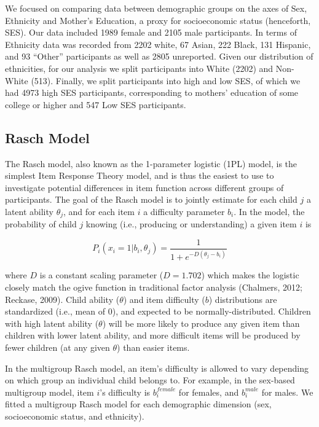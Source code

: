 \documentclass[10pt, letterpaper]{article}
\begin{document}
We focused on comparing data between demographic groups on the axes of
Sex, Ethnicity and Mother's Education, a proxy for socioeconomic status
(henceforth, SES). Our data included 1989 female and 2105 male
participants. In terms of Ethnicity data was recorded from 2202 white,
67 Asian, 222 Black, 131 Hispanic, and 93 ``Other'' participants as well
as 2805 unreported. Given our distribution of ethnicities, for our
analysis we split participants into White (2202) and Non-White (513).
Finally, we split participants into high and low SES, of which we had
4973 high SES participants, corresponding to mothers' education of some
college or higher and 547 Low SES participants.

\hypertarget{rasch-model}{%
\subsection{Rasch Model}\label{rasch-model}}

The Rasch model, also known as the 1-parameter logistic (1PL) model, is
the simplest Item Response Theory model, and is thus the easiest to use
to investigate potential differences in item function across different
groups of participants. The goal of the Rasch model is to jointly
estimate for each child \(j\) a latent ability \(\theta_j\), and for
each item \(i\) a difficulty parameter \(b_i\). In the model, the
probability of child \(j\) knowing (i.e., producing or understanding) a
given item \(i\) is

\[P_{i}(x_i = 1 | b_{i},\theta_j ) = \frac{1}{1 + e^{-D(\theta_j - b_i )}}\]

where \(D\) is a constant scaling parameter (\(D=1.702\)) which makes
the logistic closely match the ogive function in traditional factor
analysis (Chalmers, 2012; Reckase, 2009). Child ability (\(\theta\)) and
item difficulty (\(b\)) distributions are standardized (i.e., mean of
0), and expected to be normally-distributed. Children with high latent
ability (\(\theta\)) will be more likely to produce any given item than
children with lower latent ability, and more difficult items will be
produced by fewer children (at any given \(\theta\)) than easier items.

In the multigroup Rasch model, an item's difficulty is allowed to vary
depending on which group an individual child belongs to. For example, in
the sex-based multigroup model, item \(i\)'s difficulty is
\(b_{i}^{female}\) for females, and \(b_{i}^{male}\) for males. We
fitted a multigroup Rasch model for each demographic dimension (sex,
socioeconomic status, and ethnicity).
\end{document}
